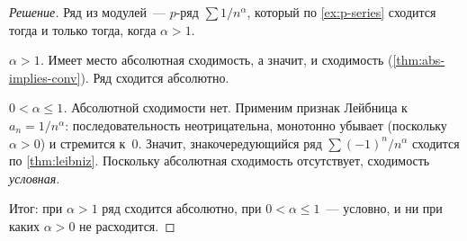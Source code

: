 \begin{proof}[Решение]
Ряд из модулей~--- $p$-ряд $\sum 1/n^{\alpha}$, который по
\cref{ex:p-series} сходится тогда и только тогда, когда $\alpha > 1$.

\emph{$\alpha > 1$.} Имеет место абсолютная сходимость, а значит, и
сходимость (\cref{thm:abs-implies-conv}). Ряд сходится абсолютно.

\emph{$0 < \alpha \le 1$.} Абсолютной сходимости нет. Применим
признак Лейбница к $a_n = 1/n^{\alpha}$: последовательность
неотрицательна, монотонно убывает (поскольку $\alpha > 0$) и стремится
к~$0$. Значит, знакочередующийся ряд $\sum (-1)^n/n^{\alpha}$
сходится по \cref{thm:leibniz}. Поскольку абсолютная сходимость
отсутствует, сходимость \emph{условная}.

Итог: при $\alpha > 1$ ряд сходится абсолютно, при $0 < \alpha \le 1$~---
условно, и ни при каких $\alpha > 0$ не расходится.
\end{proof}
